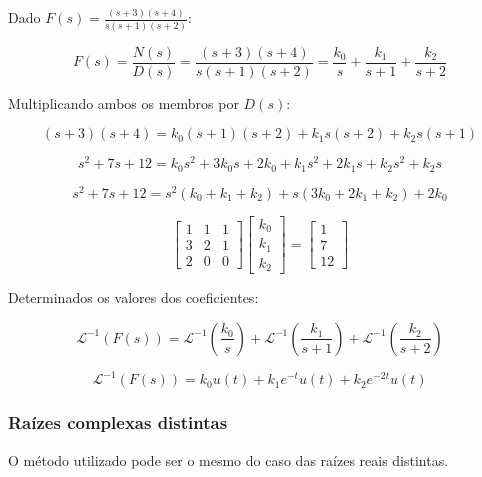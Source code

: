 \documentclass[12pt,fleqn]{book} %
\begin{document}
\begin{example}
Dado $F(s) = \frac{(s+3)(s+4)}{s(s+1)(s+2)}$:

\begin{equation}
F(s) = \frac{N(s)}{D(s)} = \frac{(s+3)(s+4)}{s(s+1)(s+2)} = \frac{k_0}{s} + \frac{k_1}{s+1} + \frac{k_2}{s+2}
\end{equation}

Multiplicando ambos os membros por $D(s)$:

\begin{equation}
(s+3)(s+4) = k_0(s+1)(s+2) + k_1s(s+2)+k_2s(s+1)
\end{equation}

\begin{equation}
s^2 + 7s + 12 = k_0s^2+3k_0s+2k_0 + k_1s^2+2k_1s + k_2s^2+k_2s
\end{equation}

\begin{equation}
s^2 + 7s + 12 = s^2(k_0+k_1+k_2) + s(3k_0+2k_1+k_2) + 2k_0
\end{equation}

\begin{equation}
\begin{bmatrix}
1&1&1\\
3&2&1\\
2&0&0
\end{bmatrix}
\begin{bmatrix}
k_0\\k_1\\k_2
\end{bmatrix}
=
\begin{bmatrix}
1\\7\\12
\end{bmatrix}
\end{equation}

Determinados os valores dos coeficientes:

\begin{equation}
\mathscr{L}^{-1}(F(s)) = \mathscr{L}^{-1}(\frac{k_0}{s}) +\mathscr{L}^{-1}(\frac{k_1}{s+1}) +\mathscr{L}^{-1}(\frac{k_2}{s+2})  
\end{equation}

\begin{equation}
\mathscr{L}^{-1}(F(s)) = k_0u(t) + k_1e^{-t}u(t) + k_2e^{-2t}u(t)
\end{equation}

\end{example}

\subsubsection{Raízes complexas distintas}
O método utilizado pode ser o mesmo do caso das raízes reais distintas.
\end{document}
